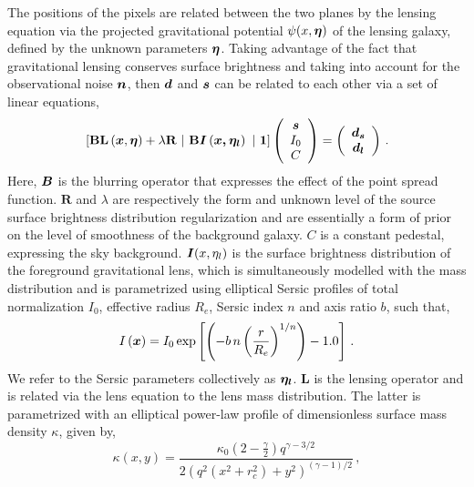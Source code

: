 \documentclass[a4paper,fleqn,usenatbib]{mnras}
\begin{document}
The positions of the pixels are related between the two planes by the lensing equation via the projected gravitational potential $\psi(x,\bmath{\eta})$ of the lensing galaxy, defined by the unknown parameters $\bmath \eta$. Taking advantage of the fact that gravitational lensing conserves surface brightness and taking into account for the observational noise $\bmath n$, then $\bmath d$ and $\bmath s$ can be related to each other via a set of linear equations,
%
\begin{equation}\label{linear_system}
\left[
\mathbf{B}\mathbf{L}\left(\bmath{x},\bmath{\eta}\right)+\lambda \mathbf{R}~|~\mathbf{B}\bmath{I}\left(\bmath{x,\eta_l}\right)~|~\bmath{1}
\right]\left(\begin{array}{c}\bmath s\\ I_0\\C\end{array} \right) = \left(\begin{array}{c}\bmath {d_s}\\ \bmath{d_l}\end{array} \right)\,.
\end{equation}
%
Here, $\bmath B$ is the blurring operator that expresses the effect of the point spread function. $\mathbf{R}$ and $\lambda$ are respectively the form and unknown level of the source surface brightness distribution regularization and are essentially a form of prior on the level of smoothness of the background galaxy. $C$ is a constant pedestal, expressing the sky background. $\bmath I({x,\eta_l})$ is the surface brightness distribution of the foreground gravitational lens, which is simultaneously modelled with the mass distribution and is parametrized using elliptical Sersic profiles of total normalization $I_0$, effective radius $R_{e}$,  Sersic index $n$ and axis ratio $b$, such that,
%
\begin{equation}
I \left (\bmath{x}\right ) = I_0 \exp \left [  \left (  - b\,n  \left (  \frac{r}{R_e} \right ) ^ {1/n} \right )  - 1.0   \right ]\,.
\end{equation}
%
We refer to the Sersic parameters collectively as $\bmath{\eta_l}$. $\mathbf{L}$ is the lensing operator and is related via the lens equation to the lens mass distribution. The latter is parametrized with an elliptical power-law profile of dimensionless surface mass density $\kappa$, given by,
%
\begin{equation}\label{massdensity}
\kappa\left (x,y \right ) = \frac{\kappa_0 \left ( 2 - \frac{\gamma}{2} \right ) q^{\gamma - 3/2}}{2 \left ( q^2 \left ( x^2 + r_c^2 \right ) + y^2\right )^{\left ( \gamma - 1 \right )/2}}\,, 
\end{equation}
\end{document}
